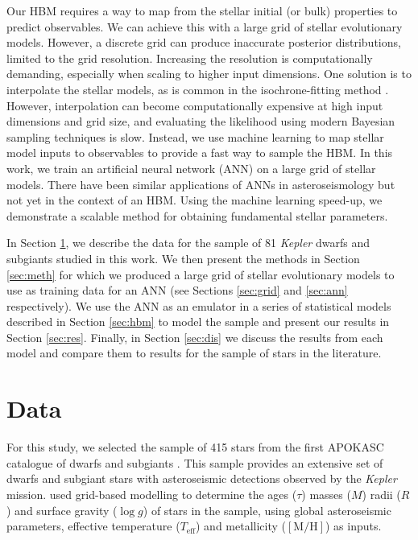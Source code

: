 \documentclass[a4paper,fleqn,usenatbib]{mnras}
\newcommand{\metallicity}{\ensuremath{[\mathrm{M}/\mathrm{H}]}}
\newcommand{\teff}{\ensuremath{T_\mathrm{eff}}}
\begin{document}
Our HBM requires a way to map from the stellar initial (or bulk) properties to predict observables. We can achieve this with a large grid of stellar evolutionary models. However, a discrete grid can produce inaccurate posterior distributions, limited to the grid resolution. Increasing the resolution is computationally demanding, especially when scaling to higher input dimensions. One solution is to interpolate the stellar models, as is common in the isochrone-fitting method \citep[see e.g.][]{Berger.Huber.ea2020}. However, interpolation can become computationally expensive at high input dimensions and grid size, and evaluating the likelihood using modern Bayesian sampling techniques is slow. Instead, we use machine learning to map stellar model inputs to observables to provide a fast way to sample the HBM. In this work, we train an artificial neural network (ANN) on a large grid of stellar models. There have been similar applications of ANNs in asteroseismology \citep{Verma.Hanasoge.ea2016, Hendriks.Aerts2019} but not yet in the context of an HBM. Using the machine learning speed-up, we demonstrate a scalable method for obtaining fundamental stellar parameters.

In Section \ref{sec:data}, we describe the data for the sample of 81 \emph{Kepler} dwarfs and subgiants studied in this work. We then present the methods in Section \ref{sec:meth} for which we produced a large grid of stellar evolutionary models to use as training data for an ANN (see Sections \ref{sec:grid} and \ref{sec:ann} respectively). We use the ANN as an emulator in a series of statistical models described in Section \ref{sec:hbm} to model the sample and present our results in Section \ref{sec:res}. Finally, in Section \ref{sec:dis} we discuss the results from each model and compare them to results for the sample of stars in the literature.

\section{Data}\label{sec:data}

For this study, we selected the sample of 415 stars from the first APOKASC catalogue of dwarfs and subgiants \citep[][hereafter ]{Serenelli.Johnson.ea2017}. This sample provides an extensive set of dwarfs and subgiant stars with asteroseismic detections observed by the \emph{Kepler} mission.  used grid-based modelling to determine the ages ($\tau$) masses ($M$) radii ($R$) and surface gravity ($\log g$) of stars in the sample, using global asteroseismic parameters, effective temperature ($\teff$) and metallicity ($\metallicity$) as inputs. 
\end{document}
